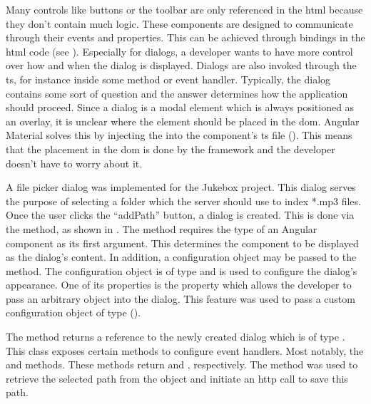Many controls like buttons or the toolbar are only referenced in the \gls{html} because they don't contain much logic. These components are designed to communicate through their events and properties. This can be achieved through bindings in the \gls{html} code (see ). Especially for dialogs, a developer wants to have more control over how and when the dialog is displayed. Dialogs are also invoked through the \gls{ts}, for instance inside some method or event handler. Typically, the dialog contains some sort of question and the answer determines how the application should proceed. Since a dialog is a modal element which is always positioned as an overlay, it is unclear where the element should be placed in the \gls{dom}. Angular Material solves this by injecting the  into the component's \gls{ts} file (). This means that the placement in the \gls{dom} is done by the framework and the developer doesn't have to worry about it.

A file picker dialog was implemented for the Jukebox project. This dialog serves the purpose of selecting a folder which the server should use to index *.mp3 files. Once the user clicks the \enquote{addPath} button, a dialog is created. This is done via the  method, as shown in . The  method requires the type of an Angular component as its first argument. This determines the component to be displayed as the dialog's content. In addition, a configuration object may be passed to the method. The configuration object is of type  and is used to configure the dialog's appearance. One of its properties is the  property which allows the developer to pass an arbitrary object into the dialog. This feature was used to pass a custom configuration object of type  ().


The  method returns a reference to the newly created dialog which is of type . This class exposes certain methods to configure event handlers. Most notably, the  and  methods. These methods return  and , respectively. The  method was used to retrieve the selected path from the  object and initiate an \gls{http} call to save this path.

